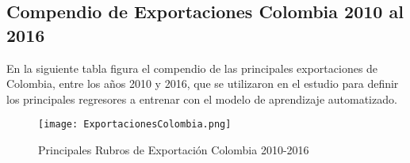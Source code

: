 \subsection{Compendio de Exportaciones Colombia 2010 al 2016}
En la siguiente tabla figura el compendio de las principales exportaciones de Colombia, entre los años 2010 y 2016, que se utilizaron en el estudio para definir los principales regresores a entrenar con el modelo de aprendizaje automatizado. \\

\begin{figure}[H]
\centering
\texttt{[image: ExportacionesColombia.png]}
\caption{Principales Rubros de Exportación Colombia 2010-2016}
\end{figure}
